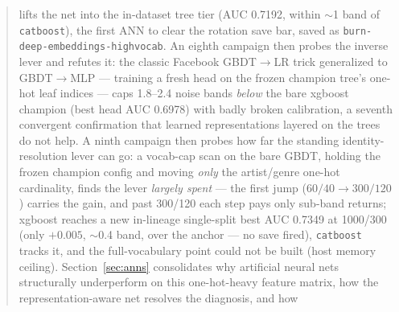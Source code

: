 \documentclass[11pt]{article}
\begin{document}
\begin{abstract}
lifts the net into the in-dataset tree tier (AUC \num{0.7192}, within $\sim$1
band of \texttt{catboost}), the first ANN to clear the rotation save bar, saved
as \texttt{burn-deep-embeddings-highvocab}. An eighth campaign then probes the inverse lever and refutes it: the classic Facebook GBDT$\to$LR trick generalized to GBDT$\to$MLP --- training a fresh head on the frozen champion tree's one-hot leaf indices --- caps \num{1.8}--\num{2.4} noise bands \emph{below} the bare xgboost champion (best head AUC \num{0.6978}) with badly broken calibration, a seventh convergent confirmation that learned representations layered on the trees do not help. A ninth campaign then probes how far the standing identity-resolution lever can go: a vocab-cap scan on the bare GBDT, holding the frozen champion config and moving \emph{only} the artist/genre one-hot cardinality, finds the lever \emph{largely spent} --- the first jump ($60/40\to300/120$) carries the gain, and past 300/120 each step pays only sub-band returns; xgboost reaches a new in-lineage single-split best AUC \num{0.7349} at 1000/300 (only $+0.005$, $\sim$0.4 band, over the anchor --- no save fired), \texttt{catboost} tracks it, and the full-vocabulary point could not be built (host memory ceiling). Section~\ref{sec:anns} consolidates
why artificial neural nets structurally underperform on this one-hot-heavy
feature matrix, how the representation-aware net resolves the diagnosis, and how

\end{abstract}
\end{document}
